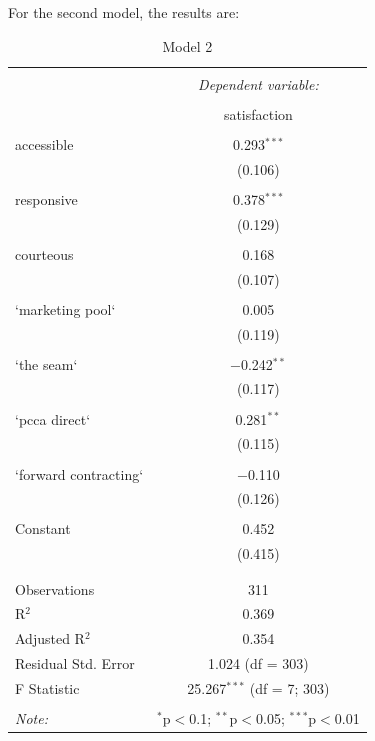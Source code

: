\documentclass[a4paper]{article}
\begin{document}
For the second model, the results are:

\begin{singlespace}
	\begin{table}[H] \centering 
		\caption{Model 2} 
		\label{} 
	  \begin{tabular}{@{\extracolsep{5pt}}lc} 
	  \\[-1.8ex]\hline 
	  \hline \\[-1.8ex] 
	   & \multicolumn{1}{c}{\textit{Dependent variable:}} \\ 
	  \cline{2-2} 
	  \\[-1.8ex] & satisfaction \\ 
	  \hline \\[-1.8ex] 
	   accessible & 0.293$^{***}$ \\ 
		& (0.106) \\ 
		& \\ 
	   responsive & 0.378$^{***}$ \\ 
		& (0.129) \\ 
		& \\ 
	   courteous & 0.168 \\ 
		& (0.107) \\ 
		& \\ 
	   `marketing pool` & 0.005 \\ 
		& (0.119) \\ 
		& \\ 
	   `the seam` & $-$0.242$^{**}$ \\ 
		& (0.117) \\ 
		& \\ 
	   `pcca direct` & 0.281$^{**}$ \\ 
		& (0.115) \\ 
		& \\ 
	   `forward contracting` & $-$0.110 \\ 
		& (0.126) \\ 
		& \\ 
	   Constant & 0.452 \\ 
		& (0.415) \\ 
		& \\ 
	  \hline \\[-1.8ex] 
	  Observations & 311 \\ 
	  R$^{2}$ & 0.369 \\ 
	  Adjusted R$^{2}$ & 0.354 \\ 
	  Residual Std. Error & 1.024 (df = 303) \\ 
	  F Statistic & 25.267$^{***}$ (df = 7; 303) \\ 
	  \hline 
	  \hline \\[-1.8ex] 
	  \textit{Note:}  & \multicolumn{1}{r}{$^{*}$p$<$0.1; $^{**}$p$<$0.05; $^{***}$p$<$0.01} \\ 
	  \end{tabular} 
	\end{table} 
\end{singlespace}
\end{document}
